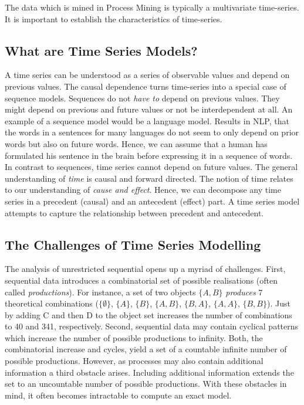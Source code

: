 \documentclass[./../../paper.tex]{subfiles}
\begin{document}
The data which is mined in Process Mining is typically a multivariate time-series. It is important to establish the characteristics of time-series.

\subsection{What are Time Series Models?}
A time series can be understood as a series of observable values and depend on previous values. The causal dependence turns time-series into a special case of sequence models. Sequences do not \emph{have to} depend on previous values. They might depend on previous and future values or not be interdependent at all. An example of a sequence model would be a language model. Results in \gls{NLP}, that the words in a sentences for many languages do not seem to only depend on prior words but also on future words\cite{frank_Hierarchicalsequentialprocessing_2018}. Hence, we can assume that a human has formulated his sentence in the brain before expressing it in a sequence of words. In contrast to sequences, time series cannot depend on future values. The general understanding of \emph{time} is causal and forward directed. The notion of time relates to our understanding of \emph{cause and effect}. Hence, we can decompose any time series in a precedent (causal) and an antecedent (effect) part\cite{leglaive_RecurrentVariationalAutoencoder_2020}. A time series model attempts to capture the relationship between precedent and antecedent.

\subsection{The Challenges of Time Series Modelling}
The analysis of unrestricted sequential opens up a myriad of challenges. First, sequential data introduces a combinatorial set of possible realisations (often called \emph{productions}). For instance, a set of two objects $\{A,B\}$ \emph{produces} 7 theoretical combinations ($\{\emptyset\}$, $\{A\}$, $\{B\}$, $\{A,B\}$, $\{B,A\}$, $\{A,A\}$, $\{B,B\}$). Just by adding C and then D to the object set increases the number of combinations to 40 and 341, respectively. %
Second, sequential data may contain cyclical patterns which increase the number of possible productions to infinity\cite{wang_Efficientrecoverymissing_2013}. Both, the combinatorial increase and cycles, yield a set of a countable infinite number of possible productions. However, as processes may also contain additional information a third obstacle arises. Including additional information extends the set to an uncountable number of possible productions. With these obstacles in mind, it often becomes intractable to compute an exact model.
\end{document}
